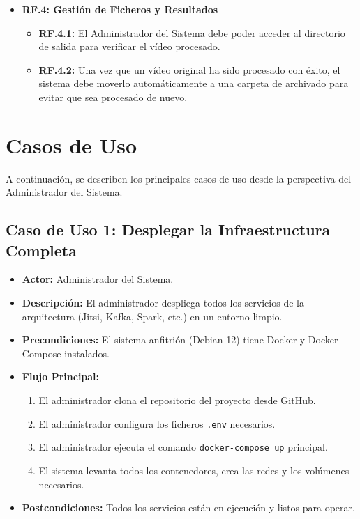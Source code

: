 \begin{itemize}
	\item \textbf{RF.4: Gestión de Ficheros y Resultados}
	\begin{itemize}
	    \item \textbf{RF.4.1:} El Administrador del Sistema debe poder acceder al directorio de salida para verificar el vídeo procesado.
	    \item \textbf{RF.4.2:} Una vez que un vídeo original ha sido procesado con éxito, el sistema debe moverlo automáticamente a una carpeta de archivado para evitar que sea procesado de nuevo.
	\end{itemize}
\end{itemize}

\section{Casos de Uso}
A continuación, se describen los principales casos de uso desde la perspectiva del Administrador del Sistema.

\subsection{Caso de Uso 1: Desplegar la Infraestructura Completa}
\begin{itemize}
    \item \textbf{Actor:} Administrador del Sistema.
    \item \textbf{Descripción:} El administrador despliega todos los servicios de la arquitectura (Jitsi, Kafka, Spark, etc.) en un entorno limpio.
    \item \textbf{Precondiciones:} El sistema anfitrión (Debian 12) tiene Docker y Docker Compose instalados.
    \item \textbf{Flujo Principal:}
        \begin{enumerate}
            \item El administrador clona el repositorio del proyecto desde GitHub.
            \item El administrador configura los ficheros \texttt{.env} necesarios.
            \item El administrador ejecuta el comando \texttt{docker-compose up} principal.
            \item El sistema levanta todos los contenedores, crea las redes y los volúmenes necesarios.
        \end{enumerate}
    \item \textbf{Postcondiciones:} Todos los servicios están en ejecución y listos para operar.
\end{itemize}

